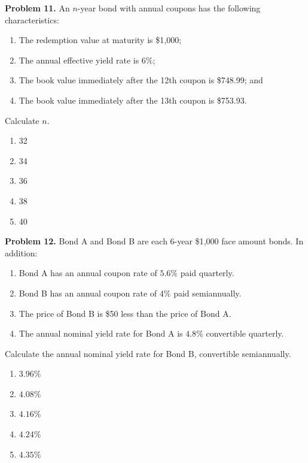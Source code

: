 \documentclass[12pt]{article}
\begin{document}
\noindent \textbf{Problem 11.}
An $n$-year bond with annual coupons has the following characteristics:

\begin{enumerate}[label = \roman*.]
\item The redemption value at maturity is \$1{,}000;
\item The annual effective yield rate is $6\%$;
\item The book value immediately after the 12th coupon is \$748.99; and
\item The book value immediately after the 13th coupon is \$753.93.
\end{enumerate}

Calculate $n$.

\vspace{.5cm}

\begin{enumerate}[label = \Alph*.]
\item 32
\item 34
\item 36
\item 38
\item 40
\end{enumerate}

\newpage

\noindent \textbf{Problem 12.}
Bond A and Bond B are each 6-year \$1{,}000 face amount bonds. In addition:

\begin{enumerate}[label = \roman*.]
\item Bond A has an annual coupon rate of $5.6\%$ paid quarterly.
\item Bond B has an annual coupon rate of $4\%$ paid semiannually.
\item The price of Bond B is \$50 less than the price of Bond A.
\item The annual nominal yield rate for Bond A is $4.8\%$ convertible quarterly.
\end{enumerate}

Calculate the annual nominal yield rate for Bond B, convertible semiannually.

\vspace{.5cm}

\begin{enumerate}[label = \Alph*.]
\item $3.96\%$
\item $4.08\%$
\item $4.16\%$
\item $4.24\%$
\item $4.35\%$
\end{enumerate}
\end{document}
